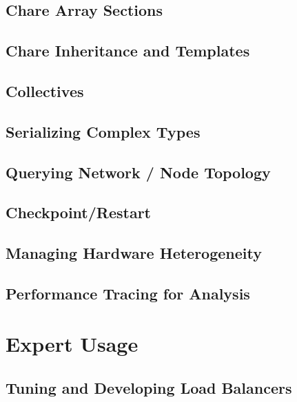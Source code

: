 \documentclass[10pt]{report}
\begin{document}
\chapter{Chare Array Sections}
\label{array section}
  

\chapter{Chare Inheritance and Templates}
\label{inheritance and templates}
  

\chapter{Collectives}
  
  

\chapter{Serializing Complex Types}
  

\chapter{Querying Network / Node Topology}
\label{topo}
  

\chapter{Checkpoint/Restart}
\label{sec:checkpoint}
  

\chapter{Managing Hardware Heterogeneity}
\label{sec:hetero}
  

\chapter{Performance Tracing for Analysis}
\label{sec:trace-projections}
  


\part{Expert Usage}

\chapter{Tuning and Developing Load Balancers}
\label{advancedlb}
  
\end{document}
